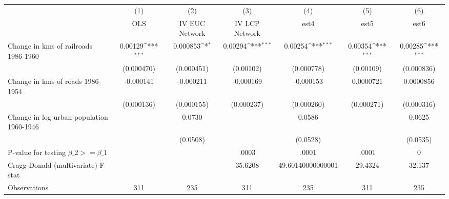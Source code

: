 {
\def\sym#1{\ifmmode^{#1}\else\(^{#1}\)\fi}
\begin{tabular}{l*{6}{c}}
\hline\hline
                &\multicolumn{1}{c}{(1)}&\multicolumn{1}{c}{(2)}&\multicolumn{1}{c}{(3)}&\multicolumn{1}{c}{(4)}&\multicolumn{1}{c}{(5)}&\multicolumn{1}{c}{(6)}\\
                &\multicolumn{1}{c}{OLS}&\multicolumn{1}{c}{IV EUC Network}&\multicolumn{1}{c}{IV LCP Network}&\multicolumn{1}{c}{est4}&\multicolumn{1}{c}{est5}&\multicolumn{1}{c}{est6}\\
\hline
Change in kms of railroads 1986-1960&  0.00129\sym{***}& 0.000853\sym{*}  &  0.00294\sym{***}&  0.00254\sym{***}&  0.00354\sym{***}&  0.00285\sym{***}\\
                &(0.000470)         &(0.000451)         &(0.00102)         &(0.000778)         &(0.00109)         &(0.000836)         \\
[1em]
Change in kms of roads 1986-1954&-0.000141         &-0.000211         &-0.000169         &-0.000153         &0.0000721         &0.0000856         \\
                &(0.000136)         &(0.000155)         &(0.000237)         &(0.000260)         &(0.000271)         &(0.000316)         \\
[1em]
Change in log urban population 1960-1946&                  &   0.0730         &                  &   0.0586         &                  &   0.0625         \\
                &                  & (0.0508)         &                  & (0.0528)         &                  & (0.0535)         \\
\hline
P-value for testing $\beta\_{2} >= \beta\_{1}$&                  &                  &    .0003         &    .0001         &    .0001         &        0         \\
Cragg-Donald (multivariate) F-stat&                  &                  &  35.6208         &49.60140000000001         &  29.4324         &   32.137         \\
Observations    &      311         &      235         &      311         &      235         &      311         &      235         \\
\hline\hline
\end{tabular}
}
